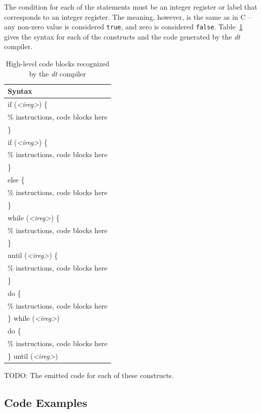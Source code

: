 The condition for each of the statements must be an 
integer register or label that corresponds to an integer 
register.  The meaning, however, is the same as in C -- 
any non-zero value is considered \texttt{true}, and zero 
is considered \texttt{false}.  Table~\ref{tab:blocks} gives 
the syntax for each of the constructs and the code generated 
by the \emph{dt} compiler.

\begin{table}
\centering
\caption{High-level code blocks recognized by the \emph{dt} compiler}
\begin{tabular}{|l|}
\hline
\textbf{Syntax} \\ \hline \hline
if (\emph{\textless ireg\textgreater}) \{ \\
\% instructions, code blocks here \\
\} \\ \hline
if (\emph{\textless ireg\textgreater}) \{ \\
\% instructions, code blocks here \\
\} \\
else \{ \\
\% instructions, code blocks here \\
\} \\ \hline
while (\emph{\textless ireg\textgreater}) \{ \\
\% instructions, code blocks here \\
\} \\ \hline
until (\emph{\textless ireg\textgreater}) \{ \\
\% instructions, code blocks here \\
\} \\ \hline
do \{ \\
\% instructions, code blocks here \\
\} while (\emph{\textless ireg\textgreater}) \\ \hline
do \{ \\
\% instructions, code blocks here \\
\} until (\emph{\textless ireg\textgreater}) \\ \hline
\end{tabular}
\label{tab:blocks}
\end{table}

TODO: The emitted code for each of these constructs.

\subsection{Code Examples}


